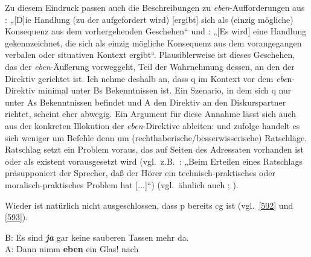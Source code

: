 Zu diesem Eindruck passen auch die Beschreibungen zu \textit{eben}-Aufforderungen aus \citet[121]{Helbig1990}: „[D]ie Handlung (zu der aufgefordert wird) [ergibt] sich als (einzig mögliche) Konsequenz aus dem vorhergehenden Geschehen“  und \citet[169]{Hentschel1986}: „[Es wird] eine Handlung gekennzeichnet, die sich als einzig mögliche Konsequenz aus dem vorangegangen verbalen oder situativen Kontext ergibt“. Plausiblerweise ist dieses Geschehen, das der \textit{eben}-Äußerung vorweggeht, Teil der Wahrnehmung dessen, an den der Direktiv gerichtet ist. Ich nehme deshalb an, dass q im Kontext vor dem \textit{ebe}n-Direktiv minimal unter Bs Bekenntnissen ist. Ein Szenario, in dem sich q nur unter As Bekenntnissen befindet und A den Direktiv an den Diskurspartner richtet, scheint eher abwegig. Ein Argument für diese Annahme lässt sich auch aus der konkreten Illokution der \textit{eben}-Direktive ableiten: \citet[102]{Dahl1988} und \citet[122]{Thurmair1989} zufolge handelt es sich weniger um Befehle  denn um (rechthaberische/besserwisserische)  Ratschläge. Ratschlag setzt ein Problem voraus, das auf Seiten des Adressaten vorhanden ist oder als existent vorausgesetzt wird (vgl.\ z.B.\ \citealt[186]{Rolf1997}: „Beim Erteilen eines Ratschlags präsupponiert der Sprecher, daß der Hörer ein technisch-praktisches oder moralisch-praktisches Problem hat [...]“) (vgl.\ ähnlich auch \citealt[409]{Hindelang1978}; \citeyear[59]{Hindelang2010}).

Wieder ist natürlich nicht ausgeschlossen, dass p bereits cg ist (vgl.\ \ref{592} und \ref{593}).

\begin{exe}
	\ex\label{592}
	B: Es sind \textbf{\textit{ja}} gar keine sauberen Tassen mehr da.\\
	A: Dann nimm \textbf{eben} ein Glas!  
	\hfill\hbox{nach \citet[105]{Dahl1988}}
\end{exe}

